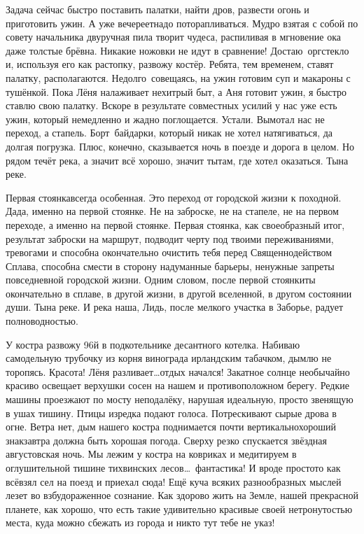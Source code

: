 Задача сейчас быстро поставить палатки, найти дров, развести огонь и приготовить ужин. А уже вечереет\mdash надо поторапливаться. Мудро взятая с собой по совету начальника двуручная пила творит чудеса, распиливая в мгновение ока даже толстые брёвна. Никакие ножовки не идут в сравнение! Достаю~оргстекло и, используя его как растопку, развожу костёр. Ребята, тем временем, ставят палатку, располагаются. Недолго~совещаясь, на ужин готовим суп и макароны с тушёнкой. Пока Лёня налаживает нехитрый быт, а Аня готовит ужин, я быстро ставлю свою палатку. Вскоре в результате совместных усилий у нас уже есть ужин, который немедленно и жадно поглощается. Устали. Вымотал нас не переход, а стапель. Борт~байдарки, который никак не хотел натягиваться, да долгая погрузка. Плюс, конечно, сказывается ночь в поезде и дорога в целом. Но рядом течёт река, а значит всё хорошо, значит ты\mdash там, где хотел оказаться. Ты\mdash на реке. 

Первая стоянка\mdash всегда особенная. Это переход от городской жизни к походной. Да\sdash да, именно на первой стоянке. Не на заброске, не на стапеле, не на первом переходе, а именно на первой стоянке. Первая стоянка, как своеобразный итог, результат заброски на маршрут, подводит черту под твоими переживаниями, тревогами и способна окончательно очистить тебя перед Священнодейством Сплава, способна смести в сторону надуманные барьеры, ненужные запреты повседневной городской жизни. Одним словом, после первой стоянки\mdash ты окончательно в сплаве, в другой жизни, в другой вселенной, в другом состоянии души. Ты\mdash на реке. И река наша, Лидь, после мелкого участка в Заборье, радует полноводностью.

У костра развожу 96\sdash й в подкотельнике десантного котелка. Набиваю самодельную трубочку из корня винограда ирландским табачком, дымлю не торопясь. Красота! Лёня разливает\ldots отдых начался! Закатное солнце необычайно красиво освещает верхушки сосен на нашем и противоположном берегу. Редкие машины проезжают по мосту неподалёку, нарушая идеальную, просто звенящую в ушах тишину. Птицы изредка подают голоса. Потрескивают сырые дрова в огне. Ветра нет, дым нашего костра поднимается почти вертикально\mdash хороший знак\mdash завтра должна быть хорошая погода. Сверху резко спускается звёздная августовская ночь. Мы лежим у костра на ковриках и медитируем в оглушительной тишине тихвинских лесов\ldots~фантастика! И вроде просто\sdash то как всё\mdash взял сел на поезд и приехал сюда! Ещё куча всяких разнообразных мыслей лезет во взбудораженное сознание. Как здорово жить на Земле, нашей прекрасной планете, как хорошо, что есть такие удивительно красивые своей нетронутостью места, куда можно сбежать из города и никто тут тебе не указ!

